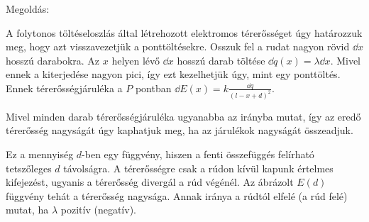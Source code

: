  
\ifdefined\megoldas

 Megoldás: 

 A folytonos töltéseloszlás által létrehozott elektromos térerősséget úgy határozzuk meg, hogy azt visszavezetjük a ponttöltésekre. Osszuk fel a rudat nagyon rövid $\dd x$ hosszú darabokra. Az $x$ helyen lévő $\dd x$ hosszú darab töltése $\dd q(x) = \lambda \dd x$. Mivel ennek a kiterjedése nagyon pici, így ezt kezelhetjük úgy, mint egy ponttöltés. Ennek térerősségjáruléka a $P$ pontban $\dd E(x) = k\frac{\dd q}{(l-x+d)^2}$. 

 Mivel minden darab térerősségjáruléka ugyanabba az irányba mutat, így az eredő térerősség nagyságát úgy kaphatjuk meg, ha az járulékok nagyságát összeadjuk.

 Ez a mennyiség $d$-ben egy függvény, hiszen a fenti összefüggés felírható tetszőleges $d$ távolságra. A térerősségre csak a rúdon kívül kapunk értelmes kifejezést, ugyanis a térerősség divergál a rúd végénél. Az ábrázolt $E(d)$ függvény tehát a térerősség nagysága. Annak iránya a rúdtól elfelé (a rúd felé) mutat, ha $\lambda$ pozitív (negatív). 
 
\fi